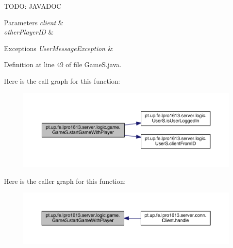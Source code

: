 T\+O\+DO\+: J\+A\+V\+A\+D\+OC 
\begin{DoxyParams}{Parameters}
{\em client} & \\
\hline
{\em other\+Player\+ID} & \\
\hline
\end{DoxyParams}

\begin{DoxyExceptions}{Exceptions}
{\em User\+Message\+Exception} & \\
\hline
\end{DoxyExceptions}


Definition at line 49 of file Game\+S.\+java.

Here is the call graph for this function\+:
\nopagebreak
\begin{figure}[H]
\begin{center}
\leavevmode
\includegraphics[width=350pt]{classpt_1_1up_1_1fe_1_1lpro1613_1_1server_1_1logic_1_1game_1_1_game_s_ae8d6ec6320a1f06d60719c91dbfbe21c_cgraph}
\end{center}
\end{figure}
Here is the caller graph for this function\+:
\nopagebreak
\begin{figure}[H]
\begin{center}
\leavevmode
\includegraphics[width=350pt]{classpt_1_1up_1_1fe_1_1lpro1613_1_1server_1_1logic_1_1game_1_1_game_s_ae8d6ec6320a1f06d60719c91dbfbe21c_icgraph}
\end{center}
\end{figure}
\hypertarget{classpt_1_1up_1_1fe_1_1lpro1613_1_1server_1_1logic_1_1game_1_1_game_s_ad185482b31f44a23e868605f9cc49d09}{}\label{classpt_1_1up_1_1fe_1_1lpro1613_1_1server_1_1logic_1_1game_1_1_game_s_ad185482b31f44a23e868605f9cc49d09} 

